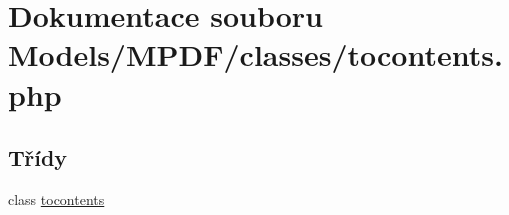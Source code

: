 \hypertarget{tocontents_8php}{\section{Dokumentace souboru Models/\-M\-P\-D\-F/classes/tocontents.php}
\label{tocontents_8php}
}
\subsection*{Třídy}
\begin{DoxyCompactItemize}
\item 
class \hyperlink{classtocontents}{tocontents}
\end{DoxyCompactItemize}
